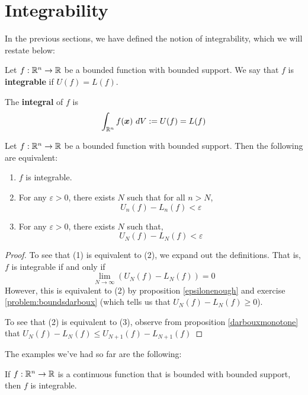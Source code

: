 \section{Integrability}\label{sec:integrability}

In the previous sections, we have defined the notion of integrability, which we will restate below:

\begin{definition}
    Let $f: \mathbb{R}^n \to \mathbb{R}$ be a bounded function with bounded support.
    We say that $f$ is \textbf{integrable} if $U(f) = L(f)$.
    
    The \textbf{integral} of $f$ is $$\int_{\mathbb{R}^n} f(\bm{x}) \ dV := U(f) = L(f)$$
    \end{definition}

\begin{proposition}
    Let $f: \mathbb{R}^n \to \mathbb{R}$ be a bounded function with bounded support.  Then the following are equivalent:

    \begin{enumerate}
        \item $f$ is integrable.
        \item For any $\varepsilon > 0$, there exists $N$ such that for all $n > N$, $$U_n(f) - L_n(f) < \varepsilon$$
        \item For any $\varepsilon > 0$, there exists $N$ such that, $$U_N(f) - L_N(f) < \varepsilon$$
    \end{enumerate}
    
\end{proposition}

    \begin{proof}
        To see that (1) is equivalent to (2), we expand out the definitions.  That is, $f$ is integrable if and only if $$\lim_{N \to \infty} \left(U_N(f) - L_N(f)\right) = 0$$  
        However, this is equivalent to (2) by proposition \ref{epsilonenough} and exercise \ref{problem:boundsdarboux} (which tells us that $U_N(f) - L_N(f) \geq 0$).

        To see that (2) is equivalent to (3), observe from proposition \ref{darbouxmonotone} that $U_N(f) - L_N(f) \leq U_{N+1}(f) - L_{N+1}(f)$
    \end{proof}



The examples we've had so far are the following:
        
    \begin{theorem}
     If $f : \mathbb{R}^n \to \mathbb{R}$ is a continuous function that is bounded with bounded support, then $f$ is integrable.   
    \end{theorem}


